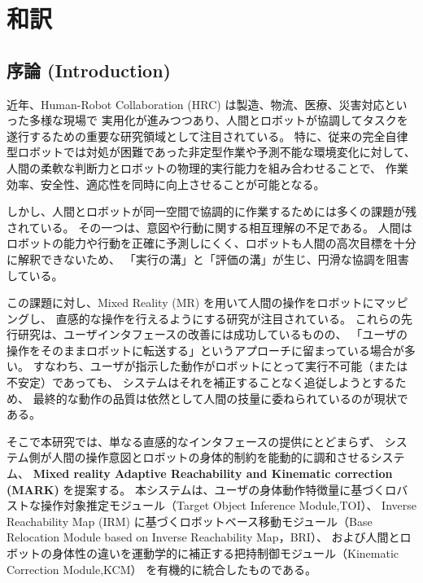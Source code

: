 \documentclass[../../main.tex]{subfiles} %
\begin{document}
\setcounter{page}{0} %

\chapter{和訳}\label{chap:introduction}





\section{序論 (Introduction)}

近年、Human-Robot Collaboration (HRC) は製造、物流、医療、災害対応といった多様な現場で
実用化が進みつつあり、人間とロボットが協調してタスクを遂行するための重要な研究領域として注目されている\cite{HRC1}\cite{HRC2}\cite{HRC3}\cite{HRC4}。
特に、従来の完全自律型ロボットでは対処が困難であった非定型作業や予測不能な環境変化に対して、
人間の柔軟な判断力とロボットの物理的実行能力を組み合わせることで、
作業効率、安全性、適応性を同時に向上させることが可能となる\cite{HRC5}\cite{HRC6}\cite{HRC7}。

しかし、人間とロボットが同一空間で協調的に作業するためには多くの課題が残されている。
その一つは、意図や行動に関する相互理解の不足である。
人間はロボットの能力や行動を正確に予測しにくく、ロボットも人間の高次目標を十分に解釈できないため、
「実行の溝」と「評価の溝」が生じ、円滑な協調を阻害している\cite{Predict1}\cite{Predict2}\cite{Predict3}。


この課題に対し、Mixed Reality (MR) を用いて人間の操作をロボットにマッピングし、
直感的な操作を行えるようにする研究が注目されている\cite{MR1}\cite{MR2}\cite{MR3}\cite{MR4}\cite{MR5}。
これらの先行研究は、ユーザインタフェースの改善には成功しているものの、
「ユーザの操作をそのままロボットに転送する」というアプローチに留まっている場合が多い。
すなわち、ユーザが指示した動作がロボットにとって実行不可能（または不安定）であっても、
システムはそれを補正することなく追従しようとするため、
最終的な動作の品質は依然として人間の技量に委ねられているのが現状である。

そこで本研究では、単なる直感的なインタフェースの提供にとどまらず、
システム側が人間の操作意図とロボットの身体的制約を能動的に調和させるシステム、
\textbf{Mixed reality Adaptive Reachability and Kinematic correction (MARK)} を提案する。
本システムは、ユーザの身体動作特徴量に基づくロバストな操作対象推定モジュール（Target Object Inference Module,TOI）、
Inverse Reachability Map (IRM) に基づくロボットベース移動モジュール（Base Relocation Module based on Inverse Reachability Map，BRI）、
および人間とロボットの身体性の違いを運動学的に補正する把持制御モジュール（Kinematic Correction Module,KCM）
を有機的に統合したものである。
\end{document}
